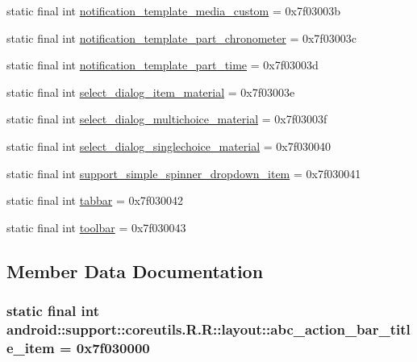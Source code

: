 \begin{CompactItemize}
\item 
static final int \hyperlink{classandroid_1_1support_1_1coreutils_1_1_r_1_1layout_4f0b6fc7c191d035782202e369ad5752}{notification\_\-template\_\-media\_\-custom} = 0x7f03003b
\item 
static final int \hyperlink{classandroid_1_1support_1_1coreutils_1_1_r_1_1layout_58536873a580c125d6b12e6d15792efe}{notification\_\-template\_\-part\_\-chronometer} = 0x7f03003c
\item 
static final int \hyperlink{classandroid_1_1support_1_1coreutils_1_1_r_1_1layout_ff1f9271b5ac17c95e4b879e5ef4ae72}{notification\_\-template\_\-part\_\-time} = 0x7f03003d
\item 
static final int \hyperlink{classandroid_1_1support_1_1coreutils_1_1_r_1_1layout_ab56b1d03f158459156e94c3cb8818de}{select\_\-dialog\_\-item\_\-material} = 0x7f03003e
\item 
static final int \hyperlink{classandroid_1_1support_1_1coreutils_1_1_r_1_1layout_70756f9c1eb27b43949c6090b975772f}{select\_\-dialog\_\-multichoice\_\-material} = 0x7f03003f
\item 
static final int \hyperlink{classandroid_1_1support_1_1coreutils_1_1_r_1_1layout_916fa9be072c43271f2da02ec4b228f2}{select\_\-dialog\_\-singlechoice\_\-material} = 0x7f030040
\item 
static final int \hyperlink{classandroid_1_1support_1_1coreutils_1_1_r_1_1layout_eb219d9c89613b37f65eec1ca401f4e4}{support\_\-simple\_\-spinner\_\-dropdown\_\-item} = 0x7f030041
\item 
static final int \hyperlink{classandroid_1_1support_1_1coreutils_1_1_r_1_1layout_510cdc697556108f24c586f66da39009}{tabbar} = 0x7f030042
\item 
static final int \hyperlink{classandroid_1_1support_1_1coreutils_1_1_r_1_1layout_f07310f34327d6e4ee4925a0b1ccb8b6}{toolbar} = 0x7f030043
\end{CompactItemize}


\subsection{Member Data Documentation}
\hypertarget{classandroid_1_1support_1_1coreutils_1_1_r_1_1layout_d5d694855db1d49af755d10143457575}{
\subsubsection[{abc\_\-action\_\-bar\_\-title\_\-item}]{\setlength{\rightskip}{0pt plus 5cm}static final int android::support::coreutils.R.R::layout::abc\_\-action\_\-bar\_\-title\_\-item = 0x7f030000}}
\label{classandroid_1_1support_1_1coreutils_1_1_r_1_1layout_d5d694855db1d49af755d10143457575}


